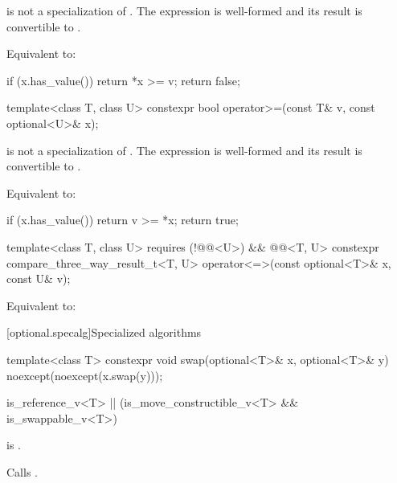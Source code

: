 \begin{itemdescr}
\pnum
\constraints
{} is not a specialization of .
The expression  is well-formed and
its result is convertible to .

\pnum
\effects
Equivalent to:
\begin{codeblock}
if (x.has_value())
  return *x >= v;
return false;
\end{codeblock}
\end{itemdescr}

%
\begin{itemdecl}
template<class T, class U> constexpr bool operator>=(const T& v, const optional<U>& x);
\end{itemdecl}

\begin{itemdescr}
\pnum
\constraints
{} is not a specialization of .
The expression  is well-formed and
its result is convertible to .

\pnum
\effects
Equivalent to:
\begin{codeblock}
if (x.has_value())
  return v >= *x;
return true;
\end{codeblock}
\end{itemdescr}

%
\begin{itemdecl}
template<class T, class U>
  requires (!@@<U>) && @@<T, U>
  constexpr compare_three_way_result_t<T, U>
    operator<=>(const optional<T>& x, const U& v);
\end{itemdecl}

\begin{itemdescr}
\pnum
\effects
Equivalent to: 
\end{itemdescr}

[optional.specalg]{Specialized algorithms}

%
\begin{itemdecl}
template<class T>
  constexpr void swap(optional<T>& x, optional<T>& y) noexcept(noexcept(x.swap(y)));
\end{itemdecl}

\begin{itemdescr}
\pnum
\constraints
\begin{codeblock}
is_reference_v<T> || (is_move_constructible_v<T> && is_swappable_v<T>)
\end{codeblock}
is .

\pnum
\effects
Calls .
\end{itemdescr}

